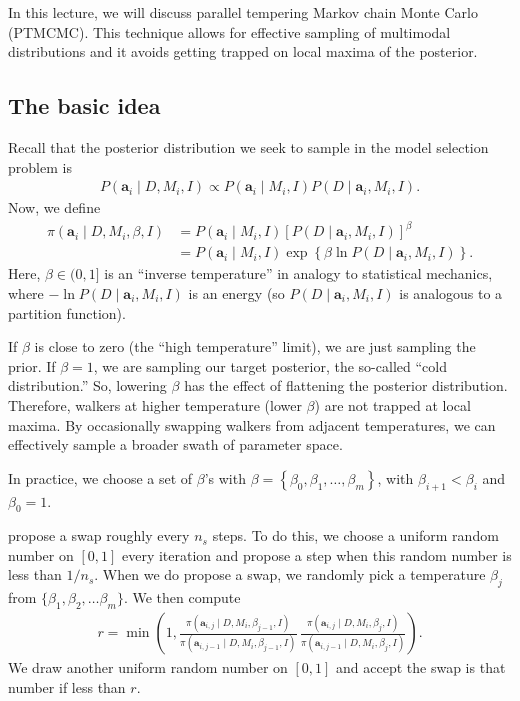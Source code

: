 In this lecture, we will discuss parallel tempering Markov chain Monte
Carlo (PTMCMC).  This technique allows for effective sampling of
multimodal distributions and it avoids getting trapped on local maxima
of the posterior.

\subsection{The basic idea}
Recall that the posterior distribution we seek to sample in the model
selection problem is
\begin{align}
P(\mathbf{a}_i\mid D, M_i, I) \propto P(\mathbf{a}_i \mid M_i, I)
P(D\mid \mathbf{a}_i,M_i, I).
\end{align}
Now, we define
\begin{align}
\pi(\mathbf{a}_i\mid D, M_i, \beta, I) &= P(\mathbf{a}_i \mid M_i, I)
\left[P(D\mid \mathbf{a}_i,M_i, I)\right]^\beta \\
&= P(\mathbf{a}_i \mid M_i, I) \exp\left\{\beta \ln P(D\mid \mathbf{a}_i,M_i, I)\right\}.
\end{align}
Here, $\beta \in (0, 1]$ is an ``inverse temperature'' in analogy to
statistical mechanics, where $-\ln P(D\mid \mathbf{a}_i,M_i, I)$ is an
energy (so $P(D\mid \mathbf{a}_i,M_i, I)$ is analogous to a partition
function).

If $\beta$ is close to zero (the ``high temperature'' limit), we are
just sampling the prior.  If $\beta = 1$, we are sampling our target
posterior, the so-called ``cold distribution.''  So, lowering $\beta$
has the effect of flattening the posterior distribution.  Therefore,
walkers at higher temperature (lower $\beta$) are not trapped at local
maxima.  By occasionally swapping walkers from adjacent temperatures,
we can effectively sample a broader swath of parameter space.

In practice, we choose a set of $\beta$'s with
$\beta = \left\{\beta_0, \beta_1, \ldots, \beta_m\right\}$, with
$\beta_{i+1} < \beta_i$ and $\beta_0 = 1$.

propose a swap roughly every $n_s$ steps.  To do this, we choose a
uniform random number on $[0,1]$ every iteration and propose a step
when this random number is less than $1/n_s$.  When we do propose a
swap, we randomly pick a temperature $\beta_j$ from
$\{\beta_1, \beta_2, \ldots \beta_m\}$.  We then compute
\begin{align}
r = \min \left(1, 
\frac{\pi(\mathbf{a}_{i,j}\mid D, M_i, \beta_{j-1}, I)}{\pi(\mathbf{a}_{i,j-1}\mid D, M_i, \beta_{j-1}, I)}\,
\frac{\pi(\mathbf{a}_{i,j}\mid D, M_i, \beta_j, I)}{\pi(\mathbf{a}_{i,j-1}\mid D, M_i, \beta_j, I)}\right).
\end{align}
We draw another uniform random number on $[0,1]$ and accept the swap
is that number if less than $r$.

